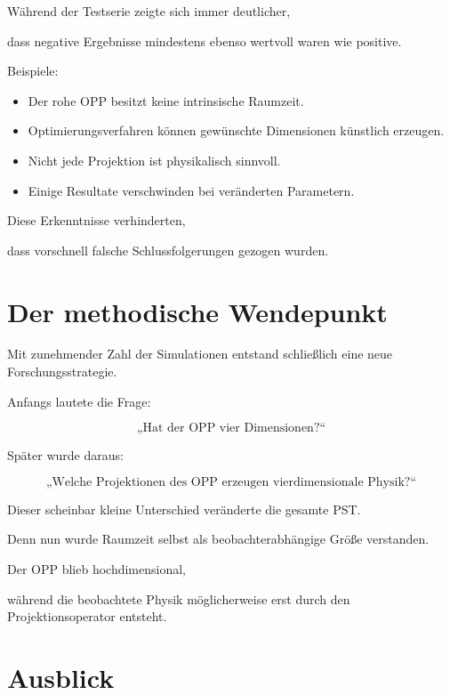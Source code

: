 Während der Testserie zeigte sich immer deutlicher,

dass negative Ergebnisse mindestens ebenso wertvoll waren wie positive.

Beispiele:

\begin{itemize}

\item
Der rohe OPP besitzt keine intrinsische Raumzeit.

\item
Optimierungsverfahren können gewünschte Dimensionen künstlich erzeugen.

\item
Nicht jede Projektion ist physikalisch sinnvoll.

\item
Einige Resultate verschwinden bei veränderten Parametern.

\end{itemize}

Diese Erkenntnisse verhinderten,

dass vorschnell falsche Schlussfolgerungen gezogen wurden.


\section*{Der methodische Wendepunkt}

Mit zunehmender Zahl der Simulationen entstand schließlich eine neue Forschungsstrategie.

Anfangs lautete die Frage:

\[
\text{„Hat der OPP vier Dimensionen?“}
\]

Später wurde daraus:

\[
\boxed{
\text{„Welche Projektionen des OPP erzeugen vierdimensionale Physik?“}
}
\]

Dieser scheinbar kleine Unterschied veränderte die gesamte PST.

Denn nun wurde Raumzeit selbst als beobachterabhängige Größe verstanden.

Der OPP blieb hochdimensional,

während die beobachtete Physik möglicherweise erst durch den Projektionsoperator entsteht.


\section*{Ausblick}

